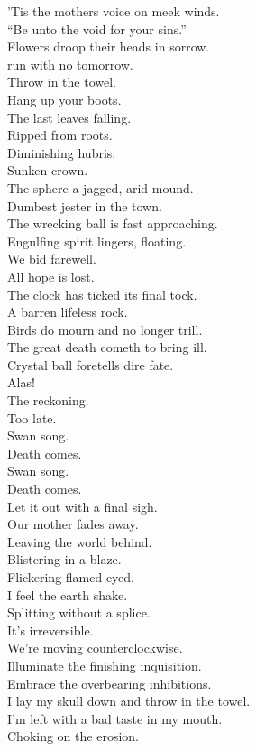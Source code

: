 'Tis the mothers voice on meek winds. \\
``Be unto the void for your sins.'' \\
Flowers droop their heads in sorrow. \\
 run with no tomorrow. \\

Throw in the towel. \\
Hang up your boots. \\
The last leaves falling. \\
Ripped from roots. \\
Diminishing hubris. \\
Sunken crown. \\
The sphere a jagged, arid mound. \\
Dumbest jester in the town. \\
The wrecking ball is fast approaching. \\
Engulfing spirit lingers, floating. \\
We bid farewell. \\
All hope is lost. \\
The clock has ticked its final tock. \\
A barren lifeless rock. \\

Birds do mourn and no longer trill. \\
The great death cometh to bring ill. \\
Crystal ball foretells dire fate. \\
Alas! \\
The reckoning. \\
Too late. \\

Swan song. \\
Death comes. \\
Swan song. \\
Death comes. \\

Let it out with a final sigh. \\
Our mother fades away. \\
Leaving the world behind. \\
Blistering in a blaze. \\
Flickering flamed-eyed. \\
I feel the earth shake. \\
Splitting without a splice. \\
It's irreversible. \\
We're moving counterclockwise. \\
Illuminate the finishing inquisition. \\
Embrace the overbearing inhibitions. \\
I lay my skull down and throw in the towel. \\
I'm left with a bad taste in my mouth. \\
Choking on the  erosion. \\

